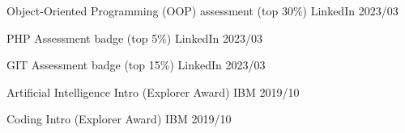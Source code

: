 

\begin{cvhonors}

  \cvhonor
    {Object-Oriented Programming (OOP) assessment (top 30\%)} %
    {LinkedIn} %
    {} %
    {2023/03} %

  \cvhonor
    {PHP Assessment badge (top 5\%)} %
    {LinkedIn} %
    {} %
    {2023/03} %

  \cvhonor
    {GIT Assessment badge (top 15\%)} %
    {LinkedIn} %
    {} %
    {2023/03} %

  \cvhonor
    {Artificial Intelligence Intro (Explorer Award)} %
    {IBM} %
    {} %
    {2019/10} %

  \cvhonor
    {Coding Intro (Explorer Award)} %
    {IBM} %
    {} %
    {2019/10} %

\end{cvhonors}
